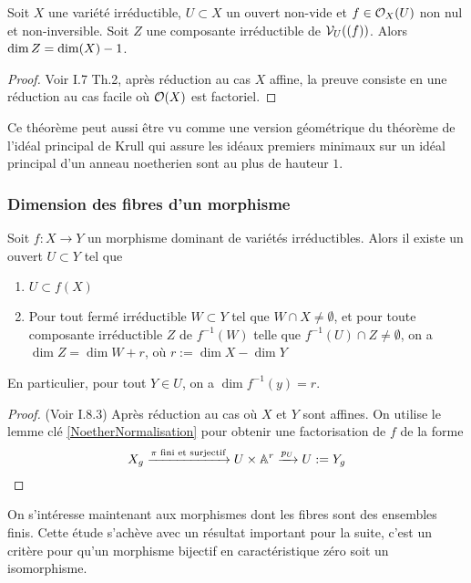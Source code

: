 \begin{thm}\label{dimsousvariete}
Soit $X$ une variété irréductible, $U\subset X$ un ouvert non-vide et $f\in \mathcal{O}_X(U)$ non nul et non-inversible. Soit $Z$ une composante irréductible de $\mathcal{V}_U((f))$. Alors $\operatorname{dim} Z= \operatorname{dim}(X)-1$.
\end{thm}
\begin{proof}
Voir \cite{MumfordRedBook} I.7 Th.2, après réduction au cas $X$ affine, la preuve consiste en une réduction au cas facile où $\mathcal{O}(X)$ est factoriel. 
\end{proof}

Ce théorème peut aussi être vu comme une version géométrique du théorème de l'idéal principal de Krull qui assure les idéaux premiers minimaux sur un idéal principal d'un anneau noetherien sont au plus de hauteur $1$.

\subsubsection{Dimension des fibres d'un morphisme}

\begin{thm}\label{dimensionfibres}
Soit $f:X\rightarrow Y$ un morphisme dominant de variétés irréductibles. Alors il existe un ouvert $U\subset Y$ tel que
\begin{enumerate}
\item $U\subset f(X)$
\item Pour tout fermé irréductible $W\subset Y$ tel que $W\cap X\neq \emptyset$, et pour toute composante irréductible $Z$ de $f^{-1}(W)$  telle que $f^{-1}(U)\cap Z\neq \emptyset$, on a $\dim Z=\dim W + r$, où $r:=\dim X -\dim Y$
\end{enumerate}
En particulier, pour tout $Y\in U$, on a $\dim f^{-1}(y)=r.$
\end{thm}
\begin{proof}
(Voir \cite{MumfordRedBook} I.8.3) Après réduction au cas où $X$ et $Y$ sont affines. On utilise le lemme clé \ref{NoetherNormalisation} pour obtenir une factorisation de $f$ de la forme 
$$X_g\xrightarrow{\pi \text{ fini et surjectif}}U\times \mathbb{A}^r \xrightarrow{p_U}U:=Y_g$$

\end{proof}

On s'intéresse maintenant aux morphismes dont les fibres sont des ensembles finis. Cette étude s'achève avec un résultat important pour la suite, c'est un critère pour qu'un morphisme bijectif en caractéristique zéro soit un isomorphisme. 


